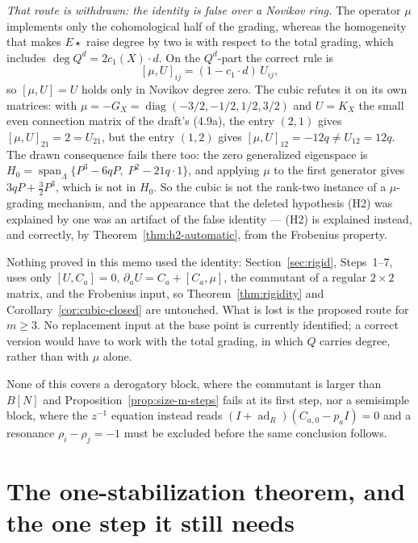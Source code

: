 \documentclass[11pt]{article}
\theoremstyle{definition}
\theoremstyle{remark}
\begin{document}
\emph{That route is withdrawn: the identity is false over a Novikov ring.} The
operator $\mu$ implements only the cohomological half of the grading, whereas
the homogeneity that makes $E\star$ raise degree by two is with respect to the
total grading, which includes $\deg Q^d=2c_1(X)\cdot d$. On the $Q^d$-part the
correct rule is
\[
  [\mu,U]_{ij}=(1-c_1\cdot d)\,U_{ij},
\]
so $[\mu,U]=U$ holds only in Novikov degree zero. The cubic refutes it on its own
matrices: with $\mu=-G_X=\operatorname{diag}(-3/2,-1/2,1/2,3/2)$ and $U=K_X$ the
small even connection matrix of the draft's (4.9a), the entry $(2,1)$ gives
$[\mu,U]_{21}=2=U_{21}$, but the entry $(1,2)$ gives
$[\mu,U]_{12}=-12q\ne U_{12}=12q$. The drawn consequence fails there too: the
zero generalized eigenspace is
$H_0=\operatorname{span}_\Lambda\{P^3-6qP,\;P^2-21q\cdot1\}$, and applying $\mu$
to the first generator gives $3qP+\tfrac32P^3$, which is not in $H_0$. So the
cubic is not the rank-two instance of a $\mu$-grading mechanism, and the
appearance that the deleted hypothesis (H2) was explained by one was an
artifact of the false identity --- (H2) is explained instead, and correctly, by
Theorem~\ref{thm:h2-automatic}, from the Frobenius property.

Nothing proved in this memo used the identity: Section~\ref{sec:rigid},
Steps~1--7, uses only $[U,C_a]=0$, $\partial_aU=C_a+[C_a,\mu]$, the commutant of
a regular $2\times2$ matrix, and the Frobenius input, so
Theorem~\ref{thm:rigidity} and Corollary~\ref{cor:cubic-closed} are untouched.
What is lost is the proposed route for $m\ge3$. No replacement input at the base
point is currently identified; a correct version would have to work with the
total grading, in which $Q$ carries degree, rather than with $\mu$ alone.

None of this covers a derogatory block, where the commutant is larger than
$B[N]$ and Proposition~\ref{prop:size-m-steps} fails at its first step, nor a
semisimple block, where the $z^{-1}$ equation instead reads
$(I+\operatorname{ad}_R)(C_{a,0}-p_aI)=0$ and a resonance $\rho_i-\rho_j=-1$
must be excluded before the same conclusion follows.

\section{The one-stabilization theorem, and the one step it still needs}
\label{sec:endpoint}
\end{document}
